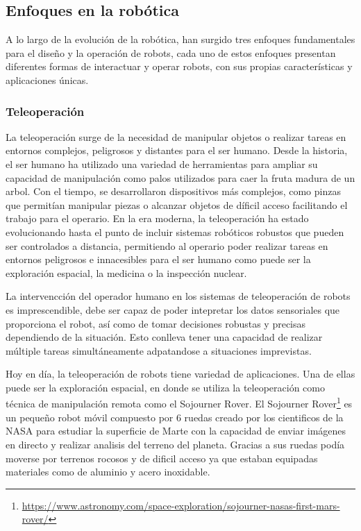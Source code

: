  \subsection{Enfoques en la robótica}
 \label{sec:enfoquesrobotica}
A lo largo de la evolución de la robótica, han surgido tres enfoques fundamentales para el diseño y la operación de robots, cada uno de estos enfoques presentan diferentes
formas de interactuar y operar robots, con sus propias características y aplicaciones únicas. 

\subsubsection{Teleoperación}
\label{sec:subseccion}

La teleoperación surge de la necesidad de manipular objetos o realizar tareas en entornos complejos, peligrosos y distantes para el ser humano. Desde la historia, el ser humano
ha utilizado una variedad de herramientas para ampliar su capacidad de manipulación como palos utilizados para caer la fruta madura de un arbol. Con el tiempo, se desarrollaron 
dispositivos más complejos, como pinzas que permitían manipular piezas o alcanzar objetos de díficil acceso facilitando el trabajo para el operario. En la era moderna, la teleoperación
ha estado evolucionando hasta el punto de incluir sistemas robóticos robustos que pueden ser controlados a distancia, permitiendo al operario poder realizar
tareas en entornos peligrosos e innacesibles para el ser humano como puede ser la exploración espacial, la medicina o la inspección nuclear. \newline

La intervencción del operador humano en los sistemas de teleoperación de robots es imprescendible, debe ser capaz de poder intepretar los datos sensoriales que proporciona el robot, así como de 
tomar decisiones robustas y precisas dependiendo de la situación. Esto conlleva tener una capacidad de realizar múltiple tareas simultáneamente adpatandose a situaciones imprevistas. \newline

Hoy en día, la teleoperación de robots tiene variedad de aplicaciones. Una de ellas puede ser la exploración espacial, en donde se utiliza la teleoperación
como técnica de manipulación remota como el Sojourner Rover. El Sojourner Rover\footnote{\url{https://www.astronomy.com/space-exploration/sojourner-nasas-first-mars-rover/}} 
es un pequeño robot móvil compuesto por 6 ruedas creado por los cientificos de la NASA para estudiar 
la superficie de Marte con la capacidad de enviar imágenes en directo y realizar analisis del terreno del planeta. Gracias a sus ruedas podía moverse por terrenos rocosos y de dificil acceso
ya que estaban equipadas materiales como de aluminio y acero inoxidable. \newline

